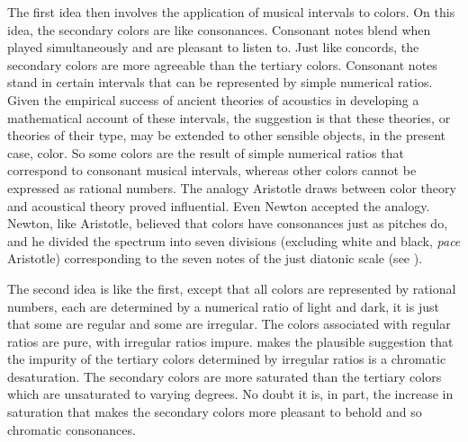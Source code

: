 The first idea then involves the application of musical intervals to colors. On this idea, the secondary colors are like consonances. Consonant notes blend when played simultaneously and are pleasant to listen to. Just like concords, the secondary colors are more agreeable than the tertiary colors. Consonant notes stand in certain intervals that can be represented by simple numerical ratios. Given the empirical success of ancient theories of acoustics in developing a mathematical account of these intervals, the suggestion is that these theories, or theories of their type, may be extended to other sensible objects, in the present case, color. So some colors are the result of simple numerical ratios that correspond to consonant musical intervals, whereas other colors cannot be expressed as rational numbers. The analogy Aristotle draws between color theory and acoustical theory proved influential. Even Newton accepted the analogy. Newton, like Aristotle, believed that colors have consonances just as pitches do, and he divided the spectrum into seven divisions (excluding white and black, \emph{pace} Aristotle) corresponding to the seven notes of the just diatonic scale (see \citealt[619]{Shapiro:1994uq}).

The second idea is like the first, except that all colors are represented by rational numbers, each are determined by a numerical ratio of light and dark, it is just that some are regular and some are irregular. The colors associated with regular ratios are pure, with irregular ratios impure. \citet[155-156]{Ross:1906fk} makes the plausible suggestion that the impurity of the tertiary colors determined by irregular ratios is a chromatic desaturation. The secondary colors are more saturated than the tertiary colors which are unsaturated to varying degrees. No doubt it is, in part, the increase in saturation that makes the secondary colors more pleasant to behold and so chromatic consonances.

